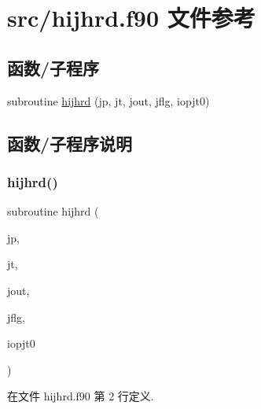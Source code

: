 \hypertarget{hijhrd_8f90}{}\section{src/hijhrd.f90 文件参考}
\label{hijhrd_8f90}
\subsection*{函数/子程序}
\begin{DoxyCompactItemize}
\item 
subroutine \mbox{\hyperlink{hijhrd_8f90_abc0a6b65d817ac94b4637241cfc19e88}{hijhrd}} (jp, jt, jout, jflg, iopjt0)
\end{DoxyCompactItemize}


\subsection{函数/子程序说明}
\mbox{\label{hijhrd_8f90_abc0a6b65d817ac94b4637241cfc19e88}} 
\subsubsection{\texorpdfstring{hijhrd()}{hijhrd()}}
{\footnotesize\ttfamily subroutine hijhrd (\begin{DoxyParamCaption}\item[{}]{jp,  }\item[{}]{jt,  }\item[{}]{jout,  }\item[{}]{jflg,  }\item[{}]{iopjt0 }\end{DoxyParamCaption})}



在文件 hijhrd.\+f90 第 2 行定义.

